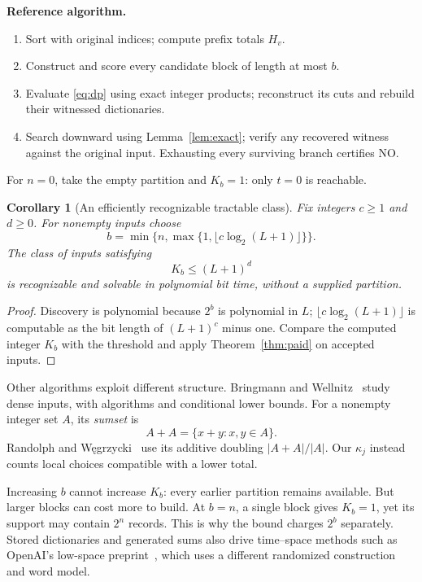 \documentclass[10pt]{article}
\newtheorem{corollary}[theorem]{Corollary}
\begin{document}
\textbf{Reference algorithm.}
\begin{enumerate}
\item Sort with original indices; compute prefix totals $H_v$.
\item Construct and score every candidate block of length at most $b$.
\item Evaluate \eqref{eq:dp} using exact integer products; reconstruct its cuts
and rebuild their witnessed dictionaries.
\item Search downward using Lemma~\ref{lem:exact}; verify any recovered witness
against the original input. Exhausting every surviving branch certifies NO.
\end{enumerate}
For $n=0$, take the empty partition and $K_b=1$: only $t=0$ is reachable.

\begin{corollary}[An efficiently recognizable tractable class]\label{cor:poly}
Fix integers $c\ge1$ and $d\ge0$. For nonempty inputs choose
\[
 b=\min\bigl\{n,\max\{1,\lfloor c\log_2(L+1)\rfloor\}\bigr\}.
\]
The class of inputs satisfying
\[
 K_b\le(L+1)^d
\]
is recognizable and solvable in polynomial
bit time, without a supplied partition.
\end{corollary}
\begin{proof}
Discovery is polynomial because $2^b$ is polynomial in $L$;
$\lfloor c\log_2(L+1)\rfloor$ is computable as the bit length of
$(L+1)^c$ minus one.
Compare the computed integer $K_b$ with the threshold and apply
Theorem~\ref{thm:paid} on accepted inputs.
\end{proof}

Other algorithms exploit different structure. Bringmann and
Wellnitz~\cite{dense} study dense inputs, with algorithms and conditional
lower bounds. For a nonempty integer set $A$, its \emph{sumset} is
\[
 A+A=\{x+y:x,y\in A\}.
\]
Randolph and W\k{e}grzycki~\cite{doubling} use its additive doubling $|A+A|/|A|$.
Our $\kappa_j$ instead counts local choices compatible with a lower total.

Increasing $b$ cannot increase $K_b$: every earlier partition remains
available. But larger blocks can cost more to build. At $b=n$, a single
block gives $K_b=1$, yet its support may contain $2^n$ records.
This is why the bound charges $2^b$ separately.
Stored dictionaries and generated sums also drive time--space methods
such as OpenAI's low-space preprint~\cite{space}, which uses a different
randomized construction and word model.
\end{document}
